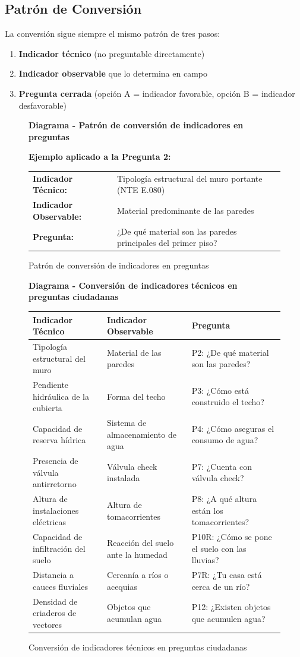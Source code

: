 \documentclass[12pt, letterpaper]{article}
\newcommand{\diagrambox}[3]{%
  \begin{figure}[H]
    \centering
    \begin{tcolorbox}[colback=white!90!blue, colframe=blue!60!black, width=\linewidth, arc=3mm, auto outer arc]
      \centering
      \textbf{Diagrama - #2} %
      \vspace{0.5cm}
      \parbox{0.95\linewidth}{\centering #3}
    \end{tcolorbox}
    \caption{#2}
    \label{fig:#1}
  \end{figure}
}
\begin{document}
\subsection{Patrón de Conversión}

La conversión sigue siempre el mismo patrón de tres pasos:

\begin{enumerate}
  \item \textbf{Indicador técnico} (no preguntable directamente)
  \item \textbf{Indicador observable} que lo determina en campo
  \item \textbf{Pregunta cerrada} (opción A = indicador favorable, opción B = indicador desfavorable)
\end{enumerate}

\diagrambox{conversion_patron}{Patrón de conversión de indicadores en preguntas}{
  \textbf{Ejemplo aplicado a la Pregunta 2:}
  
  \vspace{0.3cm}
  \begin{tabular}{p{3cm} p{10cm}}
    \textbf{Indicador Técnico:} & Tipología estructural del muro portante (NTE E.080) \\
    \textbf{Indicador Observable:} & Material predominante de las paredes \\
    \textbf{Pregunta:} & ¿De qué material son las paredes principales del primer piso?
  \end{tabular}
}

\diagrambox{conversion_indicadores}{Conversión de indicadores técnicos en preguntas ciudadanas}{
  \begin{tabular}{p{4cm} p{4cm} p{6cm}}
    \textbf{Indicador Técnico} & \textbf{Indicador Observable} & \textbf{Pregunta} \\
    \hline
    Tipología estructural del muro & Material de las paredes & P2: ¿De qué material son las paredes? \\
    Pendiente hidráulica de la cubierta & Forma del techo & P3: ¿Cómo está construido el techo? \\
    Capacidad de reserva hídrica & Sistema de almacenamiento de agua & P4: ¿Cómo aseguras el consumo de agua? \\
    Presencia de válvula antirretorno & Válvula check instalada & P7: ¿Cuenta con válvula check? \\
    Altura de instalaciones eléctricas & Altura de tomacorrientes & P8: ¿A qué altura están los tomacorrientes? \\
    Capacidad de infiltración del suelo & Reacción del suelo ante la humedad & P10R: ¿Cómo se pone el suelo con las lluvias? \\
    Distancia a cauces fluviales & Cercanía a ríos o acequias & P7R: ¿Tu casa está cerca de un río? \\
    Densidad de criaderos de vectores & Objetos que acumulan agua & P12: ¿Existen objetos que acumulen agua?
  \end{tabular}
}
\end{document}
